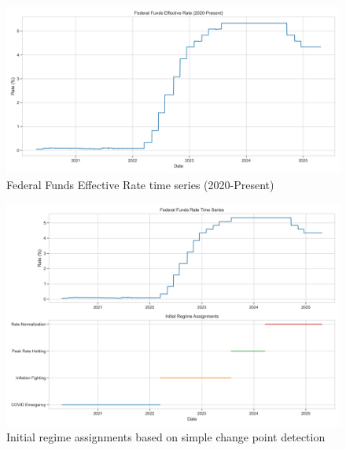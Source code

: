 
\begin{figure}[htbp]
    \centering
    \includegraphics[width=\textwidth]{figure1_ff_rate_timeseries.jpg}
    \caption{Federal Funds Effective Rate time series (2020-Present)}
    \label{fig:ff_rate_timeseries}
\end{figure}

\begin{figure}[htbp]
    \centering
    \includegraphics[width=\textwidth]{figure2_initial_regimes.jpg}
    \caption{Initial regime assignments based on simple change point detection}
    \label{fig:initial_regimes}
\end{figure}

